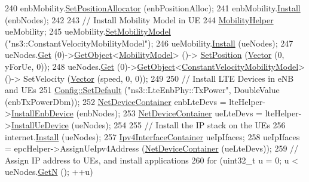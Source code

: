 \begin{DoxyCode}
240   enbMobility.\hyperlink{classns3_1_1MobilityHelper_ac59d5295076be3cc11021566713a28c5}{SetPositionAllocator} (enbPositionAlloc);
241   enbMobility.\hyperlink{classns3_1_1MobilityHelper_a07737960ee95c0777109cf2994dd97ae}{Install} (enbNodes);
242 
243   \textcolor{comment}{// Install Mobility Model in UE}
244   \hyperlink{classns3_1_1MobilityHelper}{MobilityHelper} ueMobility;
245   ueMobility.\hyperlink{classns3_1_1MobilityHelper_a030275011b6f40682e70534d30280aba}{SetMobilityModel} (\textcolor{stringliteral}{"ns3::ConstantVelocityMobilityModel"});
246   ueMobility.\hyperlink{classns3_1_1MobilityHelper_a07737960ee95c0777109cf2994dd97ae}{Install} (ueNodes);
247   ueNodes.\hyperlink{classns3_1_1NodeContainer_a9ed96e2ecc22e0f5a3d4842eb9bf90bf}{Get} (0)->\hyperlink{classns3_1_1Object_a13e18c00017096c8381eb651d5bd0783}{GetObject}<\hyperlink{classns3_1_1MobilityModel}{MobilityModel}> ()->
      \hyperlink{lena-cqi-threshold_8cc_aac02abe91b3e5592e31bc0f7d844bf4d}{SetPosition} (\hyperlink{classns3_1_1Vector3D_a7e59b47bc94c9cb1dadff68c1d0112d8}{Vector} (0, yForUe, 0));
248   ueNodes.\hyperlink{classns3_1_1NodeContainer_a9ed96e2ecc22e0f5a3d4842eb9bf90bf}{Get} (0)->\hyperlink{classns3_1_1Object_a13e18c00017096c8381eb651d5bd0783}{GetObject}<\hyperlink{classns3_1_1ConstantVelocityMobilityModel}{ConstantVelocityMobilityModel}> ()->
      SetVelocity (\hyperlink{classns3_1_1Vector3D_a7e59b47bc94c9cb1dadff68c1d0112d8}{Vector} (speed, 0, 0));
249 
250   \textcolor{comment}{// Install LTE Devices in eNB and UEs}
251   \hyperlink{group__config_ga2e7882df849d8ba4aaad31c934c40c06}{Config::SetDefault} (\textcolor{stringliteral}{"ns3::LteEnbPhy::TxPower"}, DoubleValue (enbTxPowerDbm));
252   \hyperlink{classns3_1_1NetDeviceContainer}{NetDeviceContainer} enbLteDevs = lteHelper->\hyperlink{classns3_1_1LteHelper_a5e009ad35ef85f46b5a6099263f15a03}{InstallEnbDevice} (enbNodes);
253   \hyperlink{classns3_1_1NetDeviceContainer}{NetDeviceContainer} ueLteDevs = lteHelper->\hyperlink{classns3_1_1LteHelper_ac9cd932d7de92811cfa953c2e3b2fc9f}{InstallUeDevice} (ueNodes);
254 
255   \textcolor{comment}{// Install the IP stack on the UEs}
256   internet.\hyperlink{classns3_1_1InternetStackHelper_a6645b412f31283d2d9bc3d8a95cebbc0}{Install} (ueNodes);
257   \hyperlink{classns3_1_1Ipv4InterfaceContainer}{Ipv4InterfaceContainer} ueIpIfaces;
258   ueIpIfaces = epcHelper->AssignUeIpv4Address (\hyperlink{classns3_1_1NetDeviceContainer}{NetDeviceContainer} (ueLteDevs));
259   \textcolor{comment}{// Assign IP address to UEs, and install applications}
260   \textcolor{keywordflow}{for} (uint32\_t u = 0; u < ueNodes.\hyperlink{classns3_1_1NodeContainer_aed647ac56d0407a7706aba02eb44b951}{GetN} (); ++u)

\end{DoxyCode}
